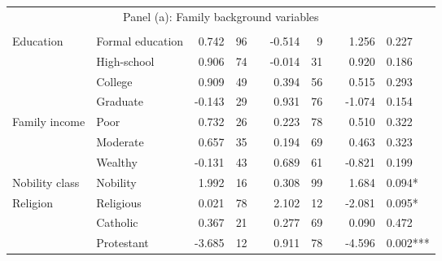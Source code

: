 \begin{table}[h!]
{\begin{threeparttable}
\begin{tabular}{llrrlrrlrl}
\multicolumn{10}{c}{Panel (a): Family background variables}      \\                                                                                                                                                       \\[-1.8ex]
Education                                                                          & Formal education     & 0.742  & 96  &  & -0.514 & 9   &  & 1.256  & 0.227                                                          \\
& High-school          & 0.906  & 74  &  & -0.014 & 31  &  & 0.920  & 0.186                                                          \\
& College              & 0.909  & 49  &  & 0.394  & 56  &  & 0.515  & 0.293                                                          \\
& Graduate             & -0.143 & 29  &  & 0.931  & 76  &  & -1.074 & 0.154                                                          \\[1.2ex] %
Family income                                                                      & Poor                 & 0.732  & 26  &  & 0.223  & 78  &  & 0.510  & 0.322                                                          \\
& Moderate             & 0.657  & 35  &  & 0.194  & 69  &  & 0.463  & 0.323                                                          \\
& Wealthy              & -0.131 & 43  &  & 0.689  & 61  &  & -0.821 & 0.199                                                          \\[1.2ex]%
Nobility class                                                                     & Nobility             & 1.992  & 16  &  & 0.308  & 99  &  & 1.684  & 0.094*                                                         \\ [1.2ex]%
Religion                                                                           & Religious            & 0.021  & 78  &  & 2.102  & 12  &  & -2.081 & 0.095*                                                         \\
& Catholic             & 0.367  & 21  &  & 0.277  & 69  &  & 0.090  & 0.472                                                          \\
& Protestant           & -3.685 & 12  &  & 0.911  & 78  &  & -4.596 & 0.002***                                                       \\

\end{tabular}
\end{threeparttable}}
\end{table}
